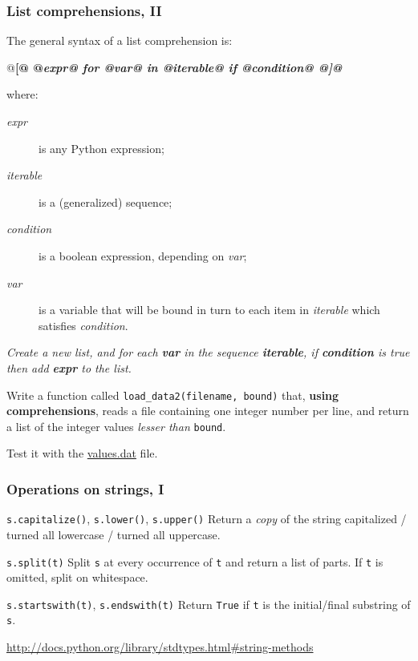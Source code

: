 \documentclass[english,serif,mathserif,xcolor=pdftex,dvipsnames,table]{beamer}
\begin{document}
\begin{frame}[fragile]
  \frametitle{List comprehensions, II}
  \def\e{\ttfamily\itshape}

  The general syntax of a list comprehension is:
  \begin{python}
    @\bf[@ @\e expr@ for @\e var@ in @\e iterable@ if @\e condition@ @\bf]@
  \end{python}
  where:
  \begin{description}
  \item[\e expr] is any Python expression;
  \item[\e iterable] is a (generalized) sequence;
  \item[\e condition] is a boolean expression, depending on
    {\e var};
  \item[\e var] is a variable that will be bound in turn to each item
    in {\e iterable} which satisfies {\e condition}.
  \end{description}

  \+ \textit{Create a new list, and for each \textbf{var} in the
    sequence \textbf{iterable}, if \textbf{condition} is true then add
    \textbf{expr} to the list.}
\end{frame}


\begin{frame}[fragile]
  \begin{exercise}
    Write a function called \texttt{load\_data2(filename, bound)}
    that, \textbf{using comprehensions}, reads a file containing one
    integer number per line, and return a list of the integer values
    \textit{lesser than} \texttt{bound}.

    Test it with the
    \href{https://raw.github.com/gc3-uzh-ch/python-course/master/values.dat}{values.dat}
    file.
  \end{exercise}
\end{frame}


\begin{frame}[fragile]
  \frametitle{Operations on strings, I}
  \begin{describe}{%
      \lstinline|s.capitalize()|,
      \lstinline|s.lower()|,
      \lstinline|s.upper()|}
    Return a \emph{copy} of the string capitalized / turned all lowercase /
    turned all uppercase.
  \end{describe}

  \begin{describe}{\lstinline|s.split(t)|}
    Split \texttt{s} at every occurrence of \texttt{t} and return a list
    of parts.  If \texttt{t} is omitted, split on whitespace.
  \end{describe}

  \begin{describe}{\lstinline|s.startswith(t)|,
      \lstinline|s.endswith(t)|}
    Return \texttt{True} if \texttt{t} is the initial/final substring
    of \texttt{s}.
  \end{describe}

  \begin{references}
    \url{http://docs.python.org/library/stdtypes.html#string-methods}
  \end{references}
\end{frame}
\end{document}
